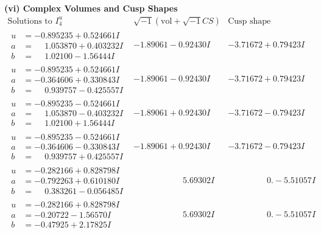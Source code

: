 \documentclass[1p]{elsarticle_modified}
\theoremstyle{definition}
\newcommand{\I}{\sqrt{-1}}
\begin{document}
\newpage\flushleft \textbf{(vi) Complex Volumes and Cusp Shapes}
$$\begin{array}{c|c|c}  
\text{Solutions to }I^u_{4}& \I (\text{vol} + \sqrt{-1}CS) & \text{Cusp shape}\\
 \hline 
\begin{aligned}
u &= -0.895235 + 0.524661 I \\
a &= \phantom{-}1.053870 + 0.403232 I \\
b &= \phantom{-}1.02100 - 1.56444 I\end{aligned}
 & -1.89061 - 0.92430 I & -3.71672 + 0.79423 I \\ \hline\begin{aligned}
u &= -0.895235 + 0.524661 I \\
a &= -0.364606 + 0.330843 I \\
b &= \phantom{-}0.939757 - 0.425557 I\end{aligned}
 & -1.89061 - 0.92430 I & -3.71672 + 0.79423 I \\ \hline\begin{aligned}
u &= -0.895235 - 0.524661 I \\
a &= \phantom{-}1.053870 - 0.403232 I \\
b &= \phantom{-}1.02100 + 1.56444 I\end{aligned}
 & -1.89061 + 0.92430 I & -3.71672 - 0.79423 I \\ \hline\begin{aligned}
u &= -0.895235 - 0.524661 I \\
a &= -0.364606 - 0.330843 I \\
b &= \phantom{-}0.939757 + 0.425557 I\end{aligned}
 & -1.89061 + 0.92430 I & -3.71672 - 0.79423 I \\ \hline\begin{aligned}
u &= -0.282166 + 0.828798 I \\
a &= -0.792263 + 0.610180 I \\
b &= \phantom{-}0.383261 - 0.056485 I\end{aligned}
 & \phantom{-0.000000 -}5.69302 I & \phantom{-0.000000 } 0. - 5.51057 I \\ \hline\begin{aligned}
u &= -0.282166 + 0.828798 I \\
a &= -0.20722 - 1.56570 I \\
b &= -0.47925 + 2.17825 I\end{aligned}
 & \phantom{-0.000000 -}5.69302 I & \phantom{-0.000000 } 0. - 5.51057 I \\ \hline\begin{aligned}

\end{aligned}
\end{array}$$
\end{document}
